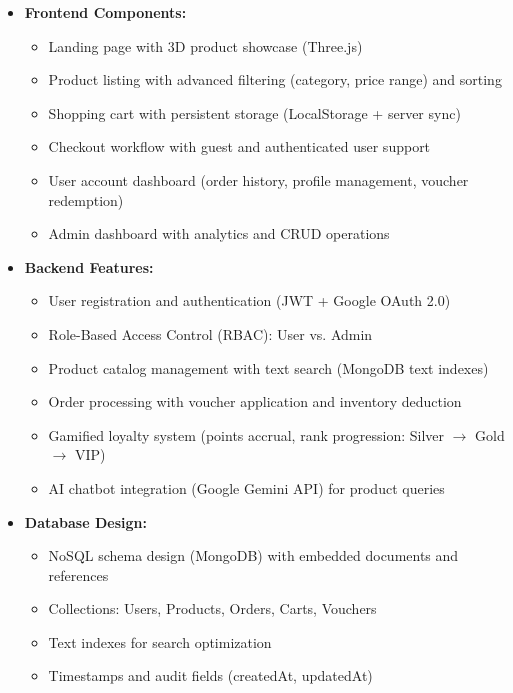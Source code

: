 \documentclass[12pt, a4paper]{report}
\begin{document}
\begin{itemize}
    \item \textbf{Frontend Components:}
    \begin{itemize}
        \item Landing page with 3D product showcase (Three.js)
        \item Product listing with advanced filtering (category, price range) and sorting
        \item Shopping cart with persistent storage (LocalStorage + server sync)
        \item Checkout workflow with guest and authenticated user support
        \item User account dashboard (order history, profile management, voucher redemption)
        \item Admin dashboard with analytics and CRUD operations
    \end{itemize}
    
    \item \textbf{Backend Features:}
    \begin{itemize}
        \item User registration and authentication (JWT + Google OAuth 2.0)
        \item Role-Based Access Control (RBAC): User vs. Admin
        \item Product catalog management with text search (MongoDB text indexes)
        \item Order processing with voucher application and inventory deduction
        \item Gamified loyalty system (points accrual, rank progression: Silver $\rightarrow$ Gold $\rightarrow$ VIP)
        \item AI chatbot integration (Google Gemini API) for product queries
    \end{itemize}
    
    \item \textbf{Database Design:}
    \begin{itemize}
        \item NoSQL schema design (MongoDB) with embedded documents and references
        \item Collections: Users, Products, Orders, Carts, Vouchers
        \item Text indexes for search optimization
        \item Timestamps and audit fields (createdAt, updatedAt)
    \end{itemize}
\end{itemize}
\end{document}
